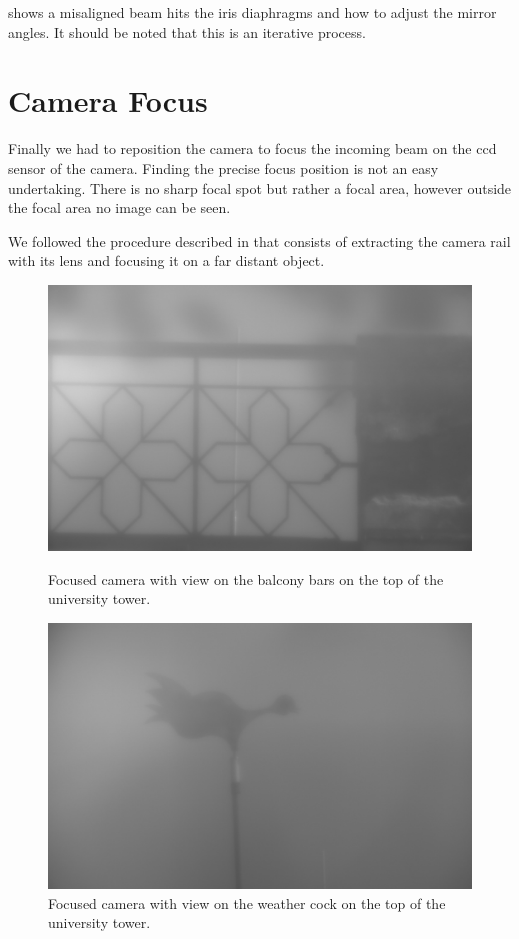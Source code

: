  shows a misaligned beam hits the iris diaphragms
and how to adjust the mirror angles. It should be noted that this is an
iterative process.

\section{Camera Focus}

Finally we had to reposition the camera to focus the incoming beam on the
\gls{ccd} sensor of the camera. Finding the precise focus position is not an
easy undertaking. There is no sharp focal spot but rather a focal area,
however outside the focal area no image can be seen.

We followed the procedure described in \cite{Hertlein2017} that consists of
extracting the camera rail with its lens and focusing it on a far distant
object.

\begin{figure}[ht]
  \centering
  \includegraphics[width=\linewidth]{images/focus/focus2.jpg}
    \caption{Focused camera with view on the balcony bars on the top of the
    university tower.}
    \label{fig:camerafocus:balcony}
  \endminipage
  \hfill
    \includegraphics[width=\linewidth]{images/focus/focus3.jpg}
    \caption{Focused camera with view on the weather cock on the top of the
    university tower.}
    \label{fig:camerafocus:cock}
  \endminipage
  \hfill
\end{figure}

